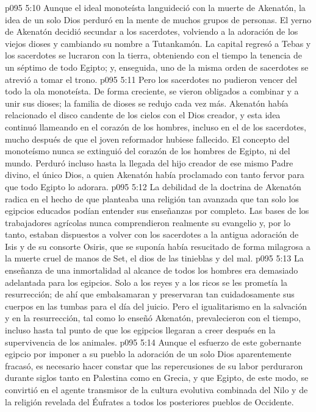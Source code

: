 \vs p095 5:10 \pc Aunque el ideal monoteísta languideció con la muerte de Akenatón, la idea de un solo Dios perduró en la mente de muchos grupos de personas. El yerno de Akenatón decidió secundar a los sacerdotes, volviendo a la adoración de los viejos dioses y cambiando su nombre a Tutankamón. La capital regresó a Tebas y los sacerdotes se lucraron con la tierra, obteniendo con el tiempo la tenencia de un séptimo de todo Egipto; y, enseguida, uno de la misma orden de sacerdotes se atrevió a tomar el trono.
\vs p095 5:11 Pero los sacerdotes no pudieron vencer del todo la ola monoteísta. De forma creciente, se vieron obligados a combinar y a unir sus dioses; la familia de dioses se redujo cada vez más. Akenatón había relacionado el disco candente de los cielos con el Dios creador, y esta idea continuó llameando en el corazón de los hombres, incluso en el de los sacerdotes, mucho después de que el joven reformador hubiese fallecido. El concepto del monoteísmo nunca se extinguió del corazón de los hombres de Egipto, ni del mundo. Perduró incluso hasta la llegada del hijo creador de ese mismo Padre divino, el único Dios, a quien Akenatón había proclamado con tanto fervor para que todo Egipto lo adorara.
\vs p095 5:12 La debilidad de la doctrina de Akenatón radica en el hecho de que planteaba una religión tan avanzada que tan solo los egipcios educados podían entender sus enseñanzas por completo. Las bases de los trabajadores agrícolas nunca comprendieron realmente su evangelio y, por lo tanto, estaban dispuestos a volver con los sacerdotes a la antigua adoración de Isis y de su consorte Osiris, que se suponía había resucitado de forma milagrosa a la muerte cruel de manos de Set, el dios de las tinieblas y del mal.
\vs p095 5:13 La enseñanza de una inmortalidad al alcance de todos los hombres era demasiado adelantada para los egipcios. Solo a los reyes y a los ricos se les prometía la resurrección; de ahí que embalsamaran y preservaran tan cuidadosamente sus cuerpos en las tumbas para el día del juicio. Pero el igualitarismo en la salvación y en la resurrección, tal como lo enseñó Akenatón, prevalecieron con el tiempo, incluso hasta tal punto de que los egipcios llegaran a creer después en la supervivencia de los animales.
\vs p095 5:14 \pc Aunque el esfuerzo de este gobernante egipcio por imponer a su pueblo la adoración de un solo Dios aparentemente fracasó, es necesario hacer constar que las repercusiones de su labor perduraron durante siglos tanto en Palestina como en Grecia, y que Egipto, de este modo, se convirtió en el agente transmisor de la cultura evolutiva combinada del Nilo y de la religión revelada del Éufrates a todos los posteriores pueblos de Occidente.
